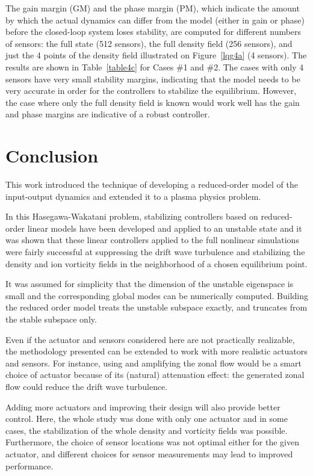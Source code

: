 \documentclass[12pt,lot, lof]{puthesis}
\begin{document}
The gain margin (GM) and the phase margin (PM), which indicate the amount by which the actual dynamics can differ from the model (either in gain or phase) before the closed-loop system loses stability, are computed for different numbers of sensors: the full state (512 sensors), the full density field (256 sensors), and just the 4 points of the density field illustrated on Figure~\ref{lqg4a} (4 sensors). The results are shown in Table~\ref{table4c} for Cases \#1 and \#2. The cases with only 4 sensors have very small stability margins, indicating that the model needs to be very accurate in order for the controllers to stabilize the equilibrium.
However, the case where only the full density field is known would work well has the gain and phase margins are indicative of a robust controller.

\section{Conclusion}

This work introduced the technique of developing a reduced-order model of the input-output dynamics and extended it to a plasma physics problem.

In this Hasegawa-Wakatani problem, stabilizing controllers based on reduced-order linear models have been developed and applied to an unstable state and it was shown that these linear controllers applied to the full nonlinear simulations were fairly successful at suppressing the drift wave turbulence  and stabilizing the density and ion vorticity fields in the neighborhood of a chosen equilibrium point.

It was assumed for simplicity that the dimension of the unstable eigenspace is small and the corresponding global modes can be numerically computed. Building the reduced order model treats the unstable subspace exactly, and truncates from the stable subspace only.
 
Even if the actuator and sensors considered here are not practically realizable, the methodology presented can be extended to work with more realistic actuators and sensors. For instance, using and amplifying the zonal flow would be a smart choice of actuator because of its (natural) attenuation effect: the generated zonal flow could reduce the drift wave turbulence.

Adding more actuators and improving their design will also provide better control. Here, the whole study was done with only one actuator and in some cases, the stabilization of the whole density and vorticity fields was possible.
Furthermore, the choice of sensor locations was not optimal either for the given actuator, and different choices for sensor measurements may lead to improved performance. 
\end{document}
